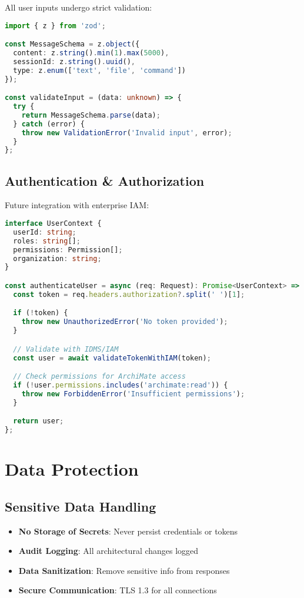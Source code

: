 \documentclass[12pt,a4paper]{report}
\begin{document}
All user inputs undergo strict validation:

\begin{lstlisting}[language=TypeScript, caption=Input Validation]
import { z } from 'zod';

const MessageSchema = z.object({
  content: z.string().min(1).max(5000),
  sessionId: z.string().uuid(),
  type: z.enum(['text', 'file', 'command'])
});

const validateInput = (data: unknown) => {
  try {
    return MessageSchema.parse(data);
  } catch (error) {
    throw new ValidationError('Invalid input', error);
  }
};
\end{lstlisting}

\subsection{Authentication \& Authorization}

Future integration with enterprise IAM:

\begin{lstlisting}[language=TypeScript, caption=Authentication Middleware]
interface UserContext {
  userId: string;
  roles: string[];
  permissions: Permission[];
  organization: string;
}

const authenticateUser = async (req: Request): Promise<UserContext> => {
  const token = req.headers.authorization?.split(' ')[1];

  if (!token) {
    throw new UnauthorizedError('No token provided');
  }

  // Validate with IDMS/IAM
  const user = await validateTokenWithIAM(token);

  // Check permissions for ArchiMate access
  if (!user.permissions.includes('archimate:read')) {
    throw new ForbiddenError('Insufficient permissions');
  }

  return user;
};
\end{lstlisting}

\section{Data Protection}

\subsection{Sensitive Data Handling}

\begin{itemize}
    \item \textbf{No Storage of Secrets}: Never persist credentials or tokens
    \item \textbf{Audit Logging}: All architectural changes logged
    \item \textbf{Data Sanitization}: Remove sensitive info from responses
    \item \textbf{Secure Communication}: TLS 1.3 for all connections
\end{itemize}
\end{document}
